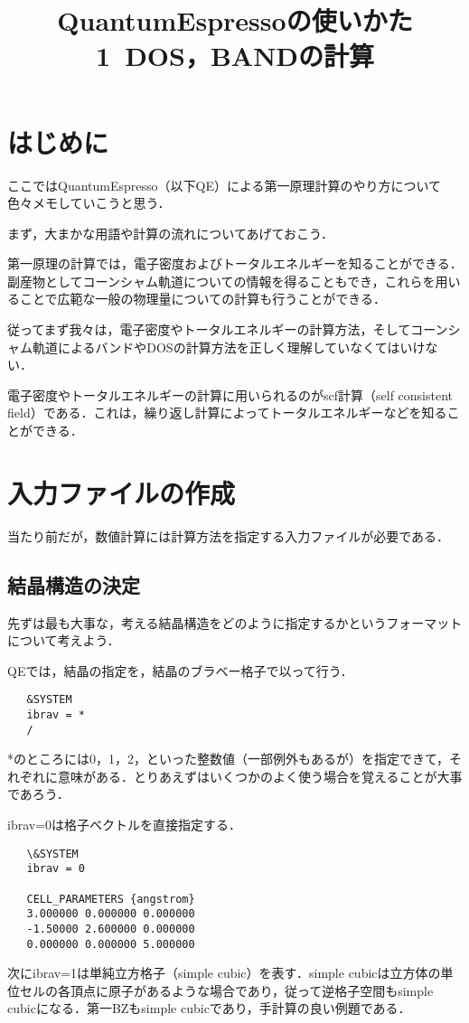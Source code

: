 \documentclass[a4j]{jarticle}
\title{QuantumEspressoの使いかた1~DOS，BANDの計算}
\author{}
\date{}
\begin{document}
\section{はじめに}

ここではQuantumEspresso（以下QE）による第一原理計算のやり方について色々メモしていこうと思う．

まず，大まかな用語や計算の流れについてあげておこう．


第一原理の計算では，電子密度およびトータルエネルギーを知ることができる．副産物としてコーンシャム軌道についての情報を得ることもでき，これらを用いることで広範な一般の物理量についての計算も行うことができる．

従ってまず我々は，電子密度やトータルエネルギーの計算方法，そしてコーンシャム軌道によるバンドやDOSの計算方法を正しく理解していなくてはいけない．

電子密度やトータルエネルギーの計算に用いられるのがscf計算（self consistent field）である．これは，繰り返し計算によってトータルエネルギーなどを知ることができる．



\section{入力ファイルの作成}
当たり前だが，数値計算には計算方法を指定する入力ファイルが必要である．

  \subsection{結晶構造の決定}
  先ずは最も大事な，考える結晶構造をどのように指定するかというフォーマットについて考えよう．

  QEでは，結晶の指定を，結晶のブラベー格子で以って行う．
  \begin{lstlisting}
   &SYSTEM
   ibrav = *
   /
  \end{lstlisting}

  *のところには0，1，2，といった整数値（一部例外もあるが）を指定できて，それぞれに意味がある．とりあえずはいくつかのよく使う場合を覚えることが大事であろう．

  ibrav=0は格子ベクトルを直接指定する．
  \begin{lstlisting}
   \&SYSTEM
   ibrav = 0

   CELL_PARAMETERS {angstrom}
   3.000000 0.000000 0.000000
   -1.50000 2.600000 0.000000
   0.000000 0.000000 5.000000
  \end{lstlisting}


  次にibrav=1は単純立方格子（simple cubic）を表す．simple cubicは立方体の単位セルの各頂点に原子があるような場合であり，従って逆格子空間もsimple cubicになる．第一BZもsimple cubicであり，手計算の良い例題である．
\end{document}

